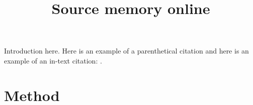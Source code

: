 \documentclass[10pt, a4paper, man, biblatex]{apa6}
\title{Source memory online}
\begin{document}
\maketitle %

Introduction here. Here is an example of a parenthetical citation
\parencite{Harlow2013} and here is an example of an in-text citation:
\textcite{Smith2016}.

\section{Method}

\printbibliography
\end{document}
